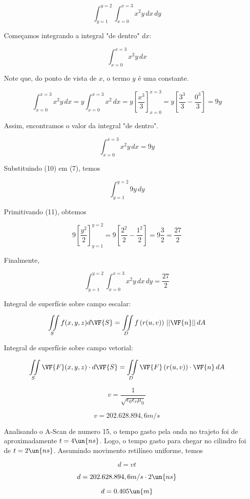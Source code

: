 \begin{equation}
    \int_{y=1}^{y=2} \int_{x=0}^{x=3} x^2y \, dx \, dy
\end{equation}

Começamos integrando a integral "de dentro" $dx$:

\begin{equation}
    \int_{x=0}^{x=3} x^2y \, dx
\end{equation}

Note que, do ponto de vista de $x$, o termo $y$ é uma constante.

\begin{equation}
    \int_{x=0}^{x=3} x^2y \, dx =
    y\int_{x=0}^{x=3} x^2 \, dx =
    y \left[\frac{x^3}{3}\right]_{x=0}^{x=3} =
    y \left[\frac{3^3}{3} - \frac{0^3}{3}\right] =
    9y
\end{equation}

Assim, encontramos o valor da integral "de dentro".

\begin{equation}
    \int_{x=0}^{x=3} x^2y \, dx = 9y
\end{equation}

Substituindo (10) em (7), temos

\begin{equation}
    \int_{y=1}^{y=2} 9y \, dy
\end{equation}

Primitivando (11), obtemos

\begin{equation}
    9 \left[\frac{y^2}{2}\right]_{y=1}^{y=2} = 
    9 \left[\frac{2^2}{2} - \frac{1^2}{2}\right] = 
    9 \frac{3}{2} = \frac{27}{2}
\end{equation}

Finalmente,

\[ \boxed{\int_{y=1}^{y=2} \int_{x=0}^{x=3} x^2y \, dx \, dy = \frac{27}{2}}  \]

Integral de superfície sobre campo escalar:

\[ \iint\limits_S f(x,y,z) d\VF{S} = \iint\limits_D f\left(r(u, v)\right) \, ||\VF{n}|| \, dA \]

Integral de superfície sobre campo vetorial:

\[ \iint\limits_S \VF{F}(x,y,z) \cdot d\VF{S} = \iint\limits_D \VF{F} \left(r(u, v)\right) \cdot \VF{n} \, dA \]


\[ v = \frac{1}{\sqrt{\epsilon_0 \epsilon_r \mu_0}} \]

\[ v = 202.628.894,6 m/s \]

Analisando o A-Scan de numero 15, o tempo gasto pela onda no trajeto 
foi de aproximadamente $t = 4 \un{ns}$. Logo, o tempo gasto para chegar no cilindro foi de 
$t = 2 \un{ns}$. Assumindo movimento retilíneo uniforme, temos

\[ d = v t \]

\[ d = 202.628.894,6 m/s \cdot 2 \un{ns} \]

\[ d = 0.405 \un{m} \]




